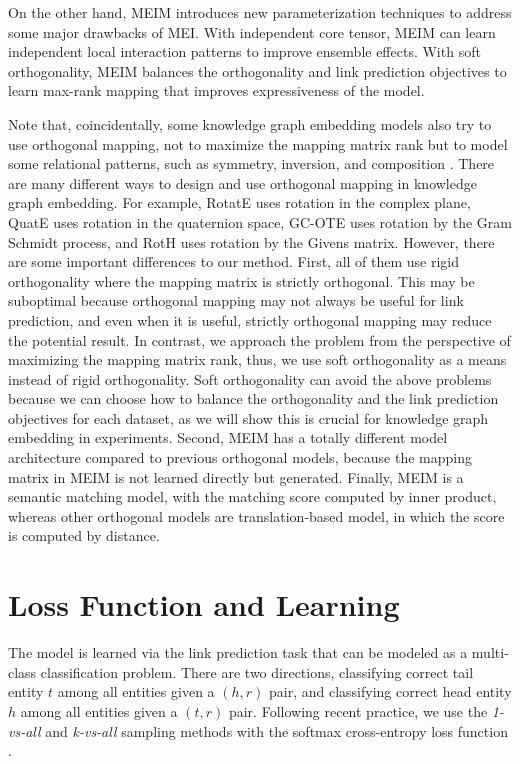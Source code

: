 \documentclass{article}
\theoremstyle{plain}
\theoremstyle{remark}
\begin{document}
On the other hand, MEIM introduces new parameterization techniques to address some major drawbacks of MEI. With independent core tensor, MEIM can learn independent local interaction patterns to improve ensemble effects. With soft orthogonality, MEIM balances the orthogonality and link prediction objectives to learn max-rank mapping that improves expressiveness of the model.

Note that, coincidentally, some knowledge graph embedding models also try to use orthogonal mapping, not to maximize the mapping matrix rank but to model some relational patterns, such as symmetry, inversion, and composition \cite{sun_rotateknowledgegraph_2019}. There are many different ways to design and use orthogonal mapping in knowledge graph embedding. For example, RotatE \cite{sun_rotateknowledgegraph_2019} uses rotation in the complex plane, QuatE \cite{zhang_quaternionknowledgegraph_2019} uses rotation in the quaternion space, GC-OTE \cite{tang_orthogonalrelationtransforms_2020} uses rotation by the Gram Schmidt process, and RotH \cite{chami_lowdimensionalhyperbolicknowledge_2020} uses rotation by the Givens matrix. However, there are some important differences to our method. First, all of them use rigid orthogonality where the mapping matrix is strictly orthogonal. This may be suboptimal because orthogonal mapping may not always be useful for link prediction, and even when it is useful, strictly orthogonal mapping may reduce the potential result. In contrast, we approach the problem from the perspective of maximizing the mapping matrix rank, thus, we use soft orthogonality as a means instead of rigid orthogonality. Soft orthogonality can avoid the above problems because we can choose how to balance the orthogonality and the link prediction objectives for each dataset, as we will show this is crucial for knowledge graph embedding in experiments. Second, MEIM has a totally different model architecture compared to previous orthogonal models, because the mapping matrix in MEIM is not learned directly but generated. Finally, MEIM is a semantic matching model, with the matching score computed by inner product, whereas other orthogonal models are translation-based model, in which the score is computed by distance.




\section{Loss Function and Learning} \label{sect:learning} The model is learned via the link prediction task that can be modeled as a multi-class classification problem. There are two directions, classifying correct tail entity $ t $ among all entities given a $ (h, r) $ pair, and classifying correct head entity $ h $ among all entities given a $ (t, r) $ pair. Following recent practice, we use the \textit{1-vs-all} and \textit{k-vs-all} sampling methods with the softmax cross-entropy loss function \cite{dettmers_convolutional2dknowledge_2018} \cite{ruffinelli_youcanteach_2020}. 
\end{document}
